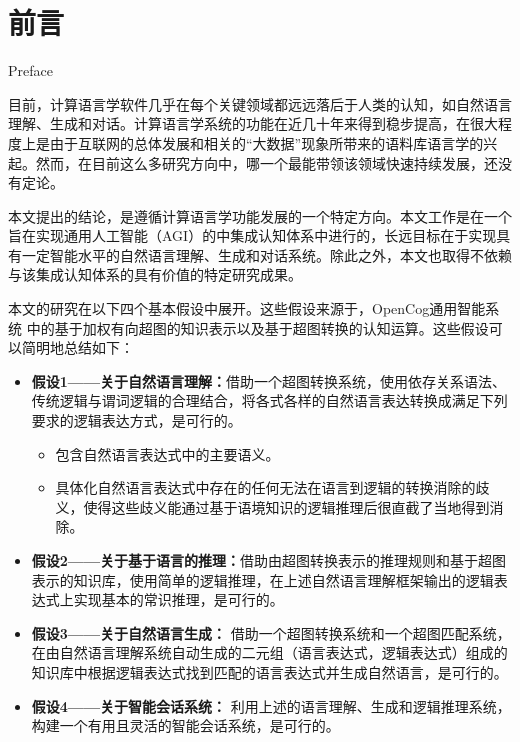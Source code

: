 \chapter{前言}{Preface}
\label{chap:intro}

目前，计算语言学软件几乎在每个关键领域都远远落后于人类的认知，如自然语言理解、生成和对话。计算语言学系统的功能在近几十年来得到稳步提高，在很大程度上是由于互联网的总体发展和相关的“大数据”现象所带来的语料库语言学的兴起。然而，在目前这么多研究方向中，哪一个最能带领该领域快速持续发展，还没有定论。

本文提出的结论，是遵循计算语言学功能发展的一个特定方向。本文工作是在一个旨在实现通用人工智能（AGI）的中集成认知体系中进行的，长远目标在于实现具有一定智能水平的自然语言理解、生成和对话系统。除此之外，本文也取得不依赖与该集成认知体系的具有价值的特定研究成果。

本文的研究在以下四个基本假设中展开。这些假设来源于，OpenCog通用智能系统 \cite{EGI1} \cite{EGI2}中的基于加权有向超图的知识表示以及基于超图转换的认知运算。这些假设可以简明地总结如下：

\begin{itemize}
\item {\bf 假设1——关于自然语言理解：}借助一个超图转换系统，使用依存关系语法、传统逻辑与谓词逻辑的合理结合，将各式各样的自然语言表达转换成满足下列要求的逻辑表达方式，是可行的。
    \begin{itemize}
    \item 包含自然语言表达式中的主要语义。
    \item 具体化自然语言表达式中存在的任何无法在语言到逻辑的转换消除的歧义，使得这些歧义能通过基于语境知识的逻辑推理后很直截了当地得到消除。
    \end{itemize}
\item {\bf 假设2——关于基于语言的推理：}借助由超图转换表示的推理规则和基于超图表示的知识库，使用简单的逻辑推理，在上述自然语言理解框架输出的逻辑表达式上实现基本的常识推理，是可行的。
\item {\bf 假设3——关于自然语言生成：} 借助一个超图转换系统和一个超图匹配系统，在由自然语言理解系统自动生成的二元组（语言表达式，逻辑表达式）组成的知识库中根据逻辑表达式找到匹配的语言表达式并生成自然语言，是可行的。
\item  {\bf 假设4——关于智能会话系统：} 利用上述的语言理解、生成和逻辑推理系统，构建一个有用且灵活的智能会话系统，是可行的。
\end{itemize}

